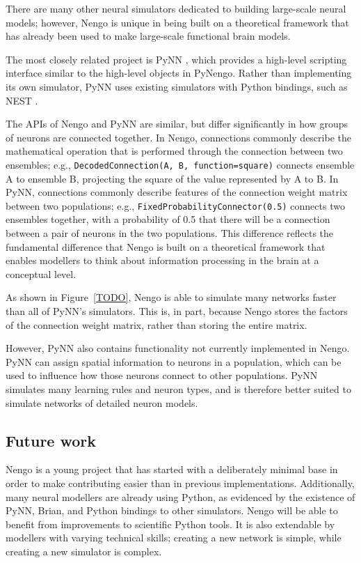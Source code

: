\documentclass{frontiersSCNS}
\begin{document}
There are many other neural simulators
dedicated to building large-scale neural models;
however, Nengo is unique in being built
on a theoretical framework
that has already been used to make
large-scale functional brain models.

The most closely related project is PyNN
\cite{TODO},
which provides a high-level scripting
interface similar to the
high-level objects in PyNengo.
Rather than implementing its
own simulator, PyNN uses existing
simulators with Python bindings,
such as NEST \cite{TODO}.

The APIs of Nengo and PyNN are similar,
but differ significantly
in how groups of neurons are connected together.
In Nengo, connections commonly describe
the mathematical operation that is performed
through the connection between
two ensembles;
e.g., \texttt{DecodedConnection(A, B,
function=square)} connects ensemble A
to ensemble B, projecting the square of
the value represented by A to B.
In PyNN, connections commonly describe
features of the connection weight matrix
between two populations;
e.g., \texttt{FixedProbabilityConnector(0.5)}
connects two ensembles together,
with a probability of 0.5
that there will be a connection
between a pair of neurons in the two populations.
This difference reflects the
fundamental difference that Nengo
is built on a theoretical framework
that enables modellers to think
about information processing in the brain
at a conceptual level.

As shown in Figure~\ref{TODO},
Nengo is able to simulate many networks
faster than all of PyNN's simulators.
This is, in part,
because Nengo stores the factors
of the connection weight matrix,
rather than storing the entire matrix.

However, PyNN also contains functionality
not currently implemented in Nengo.
PyNN can assign spatial information
to neurons in a population,
which can be used to influence
how those neurons connect to other populations.
PyNN simulates many learning rules
and neuron types,
and is therefore better suited to
simulate networks of detailed neuron models.

\subsection{Future work}

Nengo is a young project that
has started with a deliberately minimal base
in order to make contributing easier than in
previous implementations.
Additionally, many neural modellers
are already using Python,
as evidenced by the existence of
PyNN, Brian, and Python bindings to other simulators.
Nengo will be able to benefit
from improvements to scientific Python tools.
It is also extendable by modellers with
varying technical skills;
creating a new network is simple,
while creating a new simulator is complex.
\end{document}

